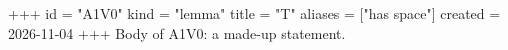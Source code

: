 +++
id = "A1V0"
kind = "lemma"
title = "T"
aliases = ["has space"]
created = 2026-11-04
+++
Body of A1V0: a made-up statement.

